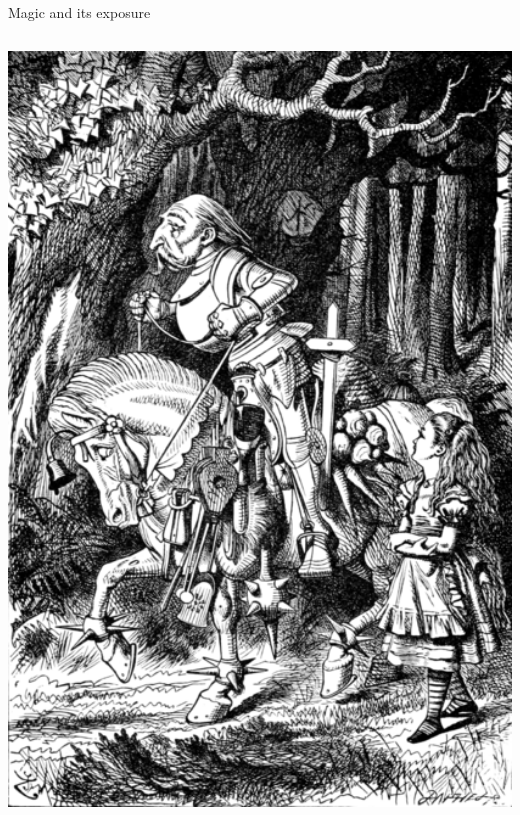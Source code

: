 \documentclass[handout]{beamer}
\begin{document}
\begin{frame}[fragile]{Magic and its exposure}
\begin{columns}[T]
\begin{column}{.45\textwidth}
  \vspace{-2ex}
  \includegraphics[width=1.15\textwidth]{white-knight.png}
\end{column}

\end{columns}

\end{frame}
\end{document}
